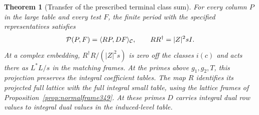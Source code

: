\documentclass[a4paper,11pt]{article}
\newtheorem{theorem}[proposition]{Theorem}
\theoremstyle{definition}
\theoremstyle{remark}
\numberwithin{equation}{section}
\begin{document}
\begin{theorem}[Transfer of the prescribed terminal class sum]
\leavevmode\label{thm:transfer380}
For every column \(P\) in the large table and every test \(F\),
the finite period with the specified representatives satisfies
\[
 {\cal P}(P,F)=\langle RP,DF\rangle_{\mathcal C},\qquad
 RR^\dagger=|Z|^2sI.
\]
At a complex embedding, \(R^\dagger R/(|Z|^2s)\) is zero off
the classes \(i(c)\) and acts there as \(L^*L/s\) in the
matching frames. At the primes above \(g_1,g_2,T\), this
projection preserves the integral coefficient tables. The map
\(R\) identifies its projected full lattice with the full
integral small table, using the lattice frames of
Proposition~\ref{prop:normalframe349}. At these primes \(D\)
carries integral dual row values to integral dual values in the
induced-level table.
\end{theorem}
\end{document}
